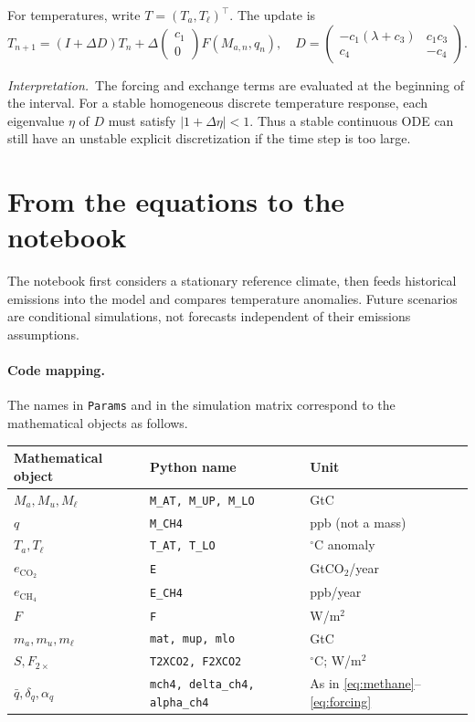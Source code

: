 \documentclass[11pt,a4paper]{article}
\newcommand{\interp}{\par\smallskip\noindent\textit{Interpretation.}\ }
\begin{document}
For temperatures, write $T=(T_a,T_\ell)^\top$. The update is
\begin{equation}\label{eq:tempstep}
 T_{n+1}=(I+\Delta D)T_n+
      \Delta\begin{pmatrix}c_1\\0\end{pmatrix}F(M_{a,n},q_n),
 \quad
 D=\begin{pmatrix}
 -c_1(\lambda+c_3)&c_1c_3\\
 c_4&-c_4
 \end{pmatrix}.
\end{equation}
\interp The forcing and exchange terms are evaluated at the beginning of
the interval. For a stable homogeneous discrete temperature response,
each eigenvalue $\eta$ of $D$ must satisfy $|1+\Delta\eta|<1$.
Thus a stable continuous ODE can still have an unstable explicit
discretization if the time step is too large.

\section{From the equations to the notebook}
The notebook first considers a stationary reference climate, then feeds
historical emissions into the model and compares temperature anomalies.
Future scenarios are conditional simulations, not forecasts independent
of their emissions assumptions.

\paragraph{Code mapping.}
The names in \texttt{Params} and in the simulation matrix correspond to
the mathematical objects as follows.
\begin{center}\small
\begin{tabular}{@{}lll@{}}
\toprule
Mathematical object & Python name & Unit\\
\midrule
$M_a,M_u,M_\ell$ & \texttt{M\_AT, M\_UP, M\_LO} & GtC\\
$q$ & \texttt{M\_CH4} & ppb (not a mass)\\
$T_a,T_\ell$ & \texttt{T\_AT, T\_LO} & $^\circ$C anomaly\\
$e_{\mathrm{CO_2}}$ & \texttt{E} & GtCO$_2$/year\\
$e_{\mathrm{CH_4}}$ & \texttt{E\_CH4} & ppb/year\\
$F$ & \texttt{F} & W/m$^2$\\
$m_a,m_u,m_\ell$ & \texttt{mat, mup, mlo} & GtC\\
$S,F_{2\times}$ & \texttt{T2XCO2, F2XCO2} & $^\circ$C; W/m$^2$\\
$\bar q,\delta_q,\alpha_q$ &
 \texttt{mch4, delta\_ch4, alpha\_ch4} & As in \eqref{eq:methane}--\eqref{eq:forcing}\\
\bottomrule
\end{tabular}
\end{center}
\end{document}
